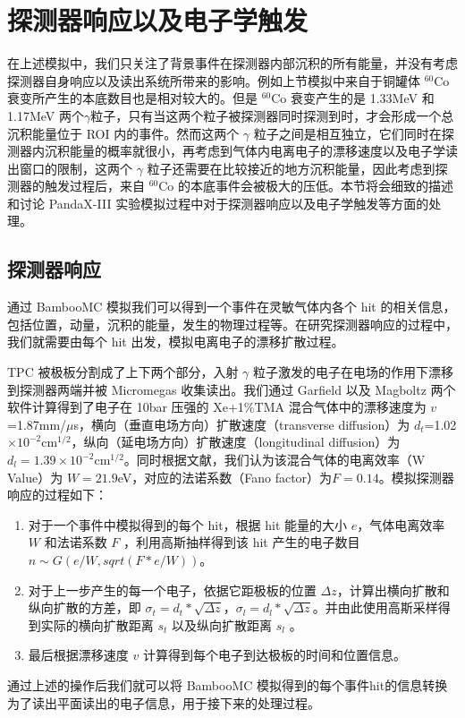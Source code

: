 \section{探测器响应以及电子学触发}

在上述模拟中，我们只关注了背景事件在探测器内部沉积的所有能量，并没有考虑探测器自身响应以及读出系统所带来的影响。例如上节模拟中来自于铜罐体 $^{60}$Co 衰变所产生的本底数目也是相对较大的。但是 $^{60}$Co 衰变产生的是 1.33MeV 和 1.17MeV 两个$\gamma$粒子，只有当这两个粒子被探测器同时探测到时，才会形成一个总沉积能量位于 ROI 内的事件。然而这两个 $\gamma$ 粒子之间是相互独立，它们同时在探测器内沉积能量的概率就很小，再考虑到气体内电离电子的漂移速度以及电子学读出窗口的限制，这两个 $\gamma$ 粒子还需要在比较接近的地方沉积能量，因此考虑到探测器的触发过程后，来自 $^{60}$Co 的本底事件会被极大的压低。本节将会细致的描述和讨论 PandaX-III 实验模拟过程中对于探测器响应以及电子学触发等方面的处理。

\subsection{探测器响应}

通过 BambooMC 模拟我们可以得到一个事件在灵敏气体内各个 hit 的相关信息，包括位置，动量，沉积的能量，发生的物理过程等。在研究探测器响应的过程中，我们就需要由每个 hit 出发，模拟电离电子的漂移扩散过程。

TPC 被极板分割成了上下两个部分，入射 $\gamma$ 粒子激发的电子在电场的作用下漂移到探测器两端并被 Micromegas 收集读出。我们通过 Garfield\supercite{garfield} 以及 Magboltz\supercite{magboltz} 两个软件计算得到了电子在 10bar 压强的 Xe+1\%TMA 混合气体中的漂移速度为 $v$=1.87mm/$\mu$s，横向（垂直电场方向）扩散速度（transverse diffusion）为 $d_{t}$=1.02$\times 10^{-2}$cm$^{1/2}$，纵向（延电场方向）扩散速度（longitudinal diffusion）为$d _{l}=1.39\times 10^{-2}$cm$^{1/2}$。同时根据文献\cite{Aprile:2009dv}，我们认为该混合气体的电离效率（W Value）为 $W=21.9$eV，对应的法诺系数（Fano factor）为$F=0.14$。模拟探测器响应的过程如下：
\begin{enumerate}
    \item 对于一个事件中模拟得到的每个 hit，根据 hit 能量的大小 $e$，气体电离效率 $W$ 和法诺系数 $F$ ，利用高斯抽样得到该 hit 产生的电子数目 $n \sim G(e/W, sqrt(F*e/W))$。
    \item 对于上一步产生的每一个电子，依据它距极板的位置 $\Delta z$，计算出横向扩散和纵向扩散的方差，即 $\sigma_{t}=d_t*\sqrt{\Delta z}$，$\sigma_{l}=d_l*\sqrt{\Delta z}$。并由此使用高斯采样得到实际的横向扩散距离 $s_t$ 以及纵向扩散距离 $s_l$ 。
    \item 最后根据漂移速度 $v$ 计算得到每个电子到达极板的时间和位置信息。
\end{enumerate}
通过上述的操作后我们就可以将 BambooMC 模拟得到的每个事件hit的信息转换为了读出平面读出的电子信息，用于接下来的处理过程。

